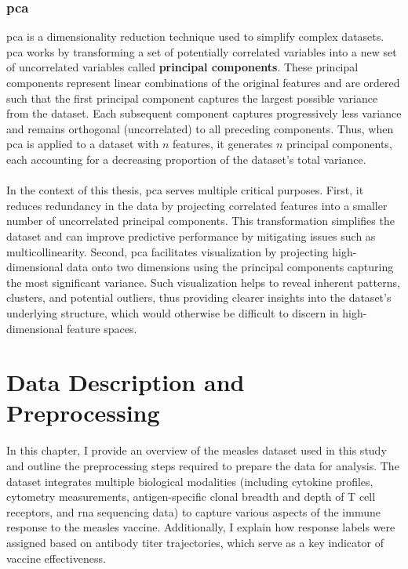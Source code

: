 \documentclass[12pt,a4paper]{report}
\begin{document}
\subsection{\acrfull{pca}}
\acrfull{pca} is a dimensionality reduction technique used to simplify complex datasets. \acrshort{pca} works by transforming a set of potentially correlated variables into a new set of uncorrelated variables called \textbf{principal components}. These principal components represent linear combinations of the original features and are ordered such that the first principal component captures the largest possible variance from the dataset. Each subsequent component captures progressively less variance and remains orthogonal (uncorrelated) to all preceding components. Thus, when \acrshort{pca} is applied to a dataset with $n$ features, it generates $n$ principal components, each accounting for a decreasing proportion of the dataset's total variance.\\
\\
In the context of this thesis, \acrshort{pca} serves multiple critical purposes. First, it reduces redundancy in the data by projecting correlated features into a smaller number of uncorrelated principal components. This transformation simplifies the dataset and can improve predictive performance by mitigating issues such as multicollinearity. Second, \acrshort{pca} facilitates visualization by projecting high-dimensional data onto two dimensions using the principal components capturing the most significant variance. Such visualization helps to reveal inherent patterns, clusters, and potential outliers, thus providing clearer insights into the dataset’s underlying structure, which would otherwise be difficult to discern in high-dimensional feature spaces.

\pagebreak
\chapter{Data Description and Preprocessing}
\noindent
In this chapter, I provide an overview of the measles dataset used in this study and outline the preprocessing steps required to prepare the data for analysis. The dataset integrates multiple biological modalities (including cytokine profiles, cytometry measurements, antigen-specific clonal breadth and depth of T cell receptors, and \acrshort{rna} sequencing data) to capture various aspects of the immune response to the measles vaccine. Additionally, I explain how response labels were assigned based on antibody titer trajectories, which serve as a key indicator of vaccine effectiveness.
\end{document}
